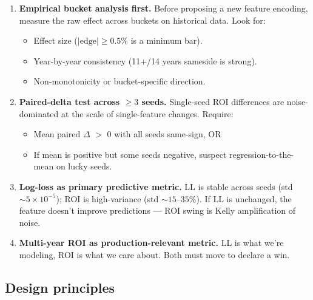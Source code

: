 \documentclass[11pt]{article}
\begin{document}
\begin{enumerate}\item \textbf{Empirical bucket analysis first.} Before proposing a new
      feature encoding, measure the raw effect across buckets on
      historical data. Look for:
      \begin{itemize}
        \item Effect size ($|\text{edge}| \geq 0.5\%$ is a minimum bar).
        \item Year-by-year consistency (11+/14 years sameside is strong).
        \item Non-monotonicity or bucket-specific direction.
      \end{itemize}
\item \textbf{Paired-delta test across $\geq 3$ seeds.} Single-seed ROI
      differences are noise-dominated at the scale of single-feature
      changes. Require:
      \begin{itemize}
        \item Mean paired $\Delta$ $>$ 0 with all seeds same-sign, OR
        \item If mean is positive but some seeds negative, suspect
              regression-to-the-mean on lucky seeds.
      \end{itemize}
\item \textbf{Log-loss as primary predictive metric.} LL is stable across
      seeds (std $\sim 5\times 10^{-5}$); ROI is high-variance (std
      $\sim 15$--$35\%$). If LL is unchanged, the feature doesn't
      improve predictions --- ROI swing is Kelly amplification of noise.
\item \textbf{Multi-year ROI as production-relevant metric.} LL is what
      we're modeling, ROI is what we care about. Both must move to
      declare a win.
\end{enumerate}

\subsection{Design principles}
\end{document}
